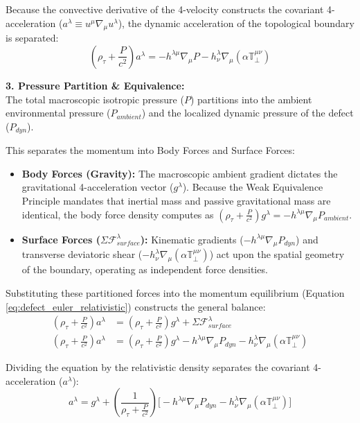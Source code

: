 Because the convective derivative of the 4-velocity constructs the covariant 4-acceleration ($a^\lambda \equiv u^\mu \nabla_\mu u^\lambda$), the dynamic acceleration of the topological boundary is separated:
\begin{equation}
    \left(\rho_\tau + \frac{P}{c^2}\right) a^\lambda = -h^{\lambda\mu} \nabla_\mu P - h^\lambda_\nu \nabla_\mu (\alpha \mathbb{T}_{\perp}^{\mu\nu}) \label{eq:defect_euler_relativistic}
\end{equation}

\textbf{3. Pressure Partition \& Equivalence:} \\
The total macroscopic isotropic pressure ($P$) partitions into the ambient environmental pressure ($P_{ambient}$) and the localized dynamic pressure of the defect ($P_{dyn}$).

This separates the momentum into Body Forces and Surface Forces:
\begin{itemize}[nosep]
    \item \textbf{Body Forces (Gravity):} The macroscopic ambient gradient dictates the gravitational 4-acceleration vector ($g^\lambda$). Because the Weak Equivalence Principle mandates that inertial mass and passive gravitational mass are identical, the body force density computes as $\left(\rho_\tau + \frac{P}{c^2}\right) g^\lambda = -h^{\lambda\mu} \nabla_\mu P_{ambient}$.
    \item \textbf{Surface Forces ($\Sigma \mathcal{F}_{surface}^\lambda$):} Kinematic gradients ($-h^{\lambda\mu} \nabla_\mu P_{dyn}$) and transverse deviatoric shear ($-h^\lambda_\nu \nabla_\mu (\alpha \mathbb{T}_{\perp}^{\mu\nu})$) act upon the spatial geometry of the boundary, operating as independent force densities.
\end{itemize}

Substituting these partitioned forces into the momentum equilibrium (Equation \ref{eq:defect_euler_relativistic}) constructs the general balance:
\begin{align}
    \left(\rho_\tau + \frac{P}{c^2}\right) a^\lambda &= \left(\rho_\tau + \frac{P}{c^2}\right) g^\lambda + \Sigma \mathcal{F}_{surface}^\lambda \nonumber \\
    \left(\rho_\tau + \frac{P}{c^2}\right) a^\lambda &= \left(\rho_\tau + \frac{P}{c^2}\right) g^\lambda - h^{\lambda\mu} \nabla_\mu P_{dyn} - h^\lambda_\nu \nabla_\mu (\alpha \mathbb{T}_{\perp}^{\mu\nu})
\end{align}

Dividing the equation by the relativistic density separates the covariant 4-acceleration ($a^\lambda$):
\begin{equation}
    a^\lambda = g^\lambda + \left( \frac{1}{\rho_\tau + \frac{P}{c^2}} \right) \Big[ -h^{\lambda\mu} \nabla_\mu P_{dyn} - h^\lambda_\nu \nabla_\mu (\alpha \mathbb{T}_{\perp}^{\mu\nu}) \Big] \label{eq:relativistic_compliance_modified_ns}
\end{equation}

